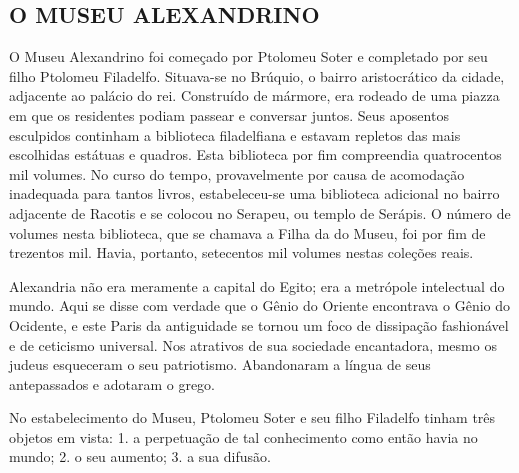\documentclass[11pt,a5paper,twoside,openany]{book}
\begin{document}
\subsection*{O MUSEU ALEXANDRINO}
O Museu Alexandrino foi começado por Ptolomeu Soter e completado por seu filho Ptolomeu Filadelfo. Situava-se no Brúquio, o bairro aristocrático da cidade, adjacente ao palácio do rei. Construído de mármore, era rodeado de uma piazza em que os residentes podiam passear e conversar juntos. Seus aposentos esculpidos continham a biblioteca filadelfiana e estavam repletos das mais escolhidas estátuas e quadros. Esta biblioteca por fim compreendia quatrocentos mil volumes. No curso do tempo, provavelmente por causa de acomodação inadequada para tantos livros, estabeleceu-se uma biblioteca adicional no bairro adjacente de Racotis e se colocou no Serapeu, ou templo de Serápis. O número de volumes nesta biblioteca, que se chamava a Filha da do Museu, foi por fim de trezentos mil. Havia, portanto, setecentos mil volumes nestas coleções reais.

Alexandria não era meramente a capital do Egito; era a metrópole intelectual do mundo. Aqui se disse com verdade que o Gênio do Oriente encontrava o Gênio do Ocidente, e este Paris da antiguidade se tornou um foco de dissipação fashionável e de ceticismo universal. Nos atrativos de sua sociedade encantadora, mesmo os judeus esqueceram o seu patriotismo. Abandonaram a língua de seus antepassados e adotaram o grego.

No estabelecimento do Museu, Ptolomeu Soter e seu filho Filadelfo tinham três objetos em vista: 1. a perpetuação de tal conhecimento como então havia no mundo; 2. o seu aumento; 3. a sua difusão.
\end{document}
